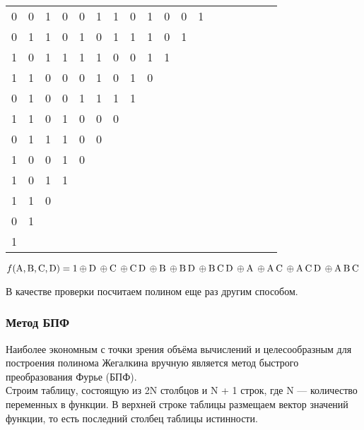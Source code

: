 \documentclass[a4paper, 14pt]{extarticle}
\begin{document}
\begin{center}
\begin{adjustbox}{max width=1\textwidth}
\begin{tabular}{|c|c|c|c|c|c|c|c|c|c|c|c|c|c|c|c|c|c}
      \cline{1-13}
      0 & 0 & 1 & 0 & 0 & 1 & 1 & 0 & 1 & 0 & 0 & 1 \\
      \cline{1-12}
      0 & 1 & 1 & 0 & 1 & 0 & 1 & 1 & 1 & 0 & 1 \\
      \cline{1-11}
      1 & 0 & 1 & 1 & 1 & 1 & 0 & 0 & 1 & 1 \\
      \cline{1-10}
      1 & 1 & 0 & 0 & 0 & 1 & 0 & 1 & 0 \\
      \cline{1-9}
      0 & 1 & 0 & 0 & 1 & 1 & 1 & 1 \\
      \cline{1-8}
      1 & 1 & 0 & 1 & 0 & 0 & 0 \\
      \cline{1-7}
      0 & 1 & 1 & 1 & 0 & 0 \\
      \cline{1-6}
      1 & 0 & 0 & 1 & 0 \\
      \cline{1-5}
      1 & 0 & 1 & 1 \\
      \cline{1-4}
      1 & 1 & 0 \\
      \cline{1-3}
      0 & 1 \\
      \cline{1-2}
      1 \\
      \cline{1-1}
    \end{tabular}
  \end{adjustbox}
\end{center}

\begin{equation*}
  f(\text{A}, \text{B}, \text{C}, \text{D}) = 1 \oplus \text{D} \hspace{2pt} \oplus \text{C} \hspace{2pt} \oplus
  \text{C} \hspace{2pt}\text{D} \hspace{2pt} \oplus \text{B} \hspace{2pt} \oplus \text{B} \hspace{2pt}\text{D} \hspace{2pt} \oplus \text{B} \hspace{2pt}\text{C} \hspace{2pt}\text{D} \hspace{2pt} \oplus
  \text{A} \hspace{2pt} \oplus \text{A} \hspace{2pt}\text{C} \hspace{2pt} \oplus \text{A} \hspace{2pt}\text{C} \hspace{2pt}\text{D} \hspace{2pt} \oplus \text{A} \hspace{2pt}\text{B} \hspace{2pt}\text{C} \hspace{2pt}
\end{equation*}

\newpage

В качестве проверки посчитаем полином еще раз другим способом.

\subsubsection{Метод БПФ}

Наиболее экономным с точки зрения объёма вычислений и целесообразным для построения 
полинома Жегалкина вручную является метод быстрого преобразования Фурье (БПФ).\\

Строим таблицу, состоящую из 2N столбцов и N + 1 строк, где N — количество переменных в 
функции. В верхней строке таблицы размещаем вектор значений функции, то есть последний 
столбец таблицы истинности.\\
\end{document}
